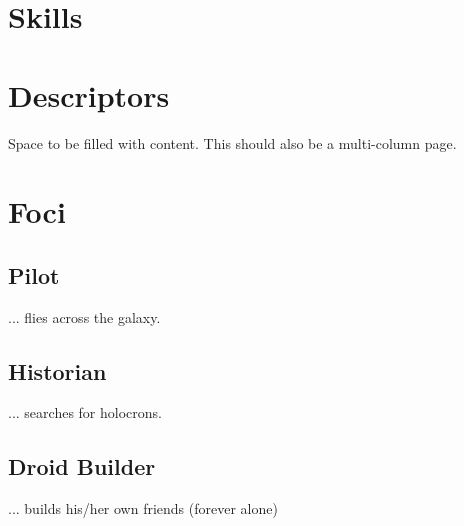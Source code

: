 \documentclass[a4paper,10pt,final,twocolumn,oneside]{book}
\begin{document}


\clearpage

\section{Skills} %
\label{sec:skills}


\clearpage

\section{Descriptors} %
\label{sec:descriptors}

Space to be filled with content. This should also be a multi-column page.


\clearpage

\section{Foci} %
\label{sec:foci}

\subsection{Pilot} %
\label{sub:pilot}

... flies across the galaxy.


\clearpage

\subsection{Historian} %
\label{sub:historian}

... searches for holocrons.


\clearpage

\subsection{Droid Builder} %
\label{sub:droid_builder}

... builds his/her own friends (forever alone)


\end{document}
